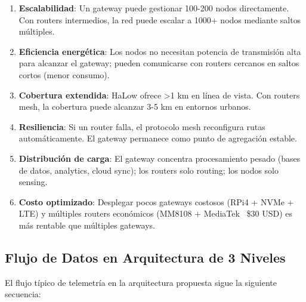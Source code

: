 \begin{enumerate}
    \item \textbf{Escalabilidad}: Un gateway puede gestionar 100-200 nodos directamente. Con routers intermedios, la red puede escalar a 1000+ nodos mediante saltos múltiples.
    \item \textbf{Eficiencia energética}: Los nodos no necesitan potencia de transmisión alta para alcanzar el gateway; pueden comunicarse con routers cercanos en saltos cortos (menor consumo).
    \item \textbf{Cobertura extendida}: HaLow ofrece >1 km en línea de vista. Con routers mesh, la cobertura puede alcanzar 3-5 km en entornos urbanos.
    \item \textbf{Resiliencia}: Si un router falla, el protocolo mesh reconfigura rutas automáticamente. El gateway permanece como punto de agregación estable.
    \item \textbf{Distribución de carga}: El gateway concentra procesamiento pesado (bases de datos, analytics, cloud sync); los routers solo routing; los nodos solo sensing.
    \item \textbf{Costo optimizado}: Desplegar pocos gateways costosos (RPi4 + NVMe + LTE) y múltiples routers económicos (MM8108 + MediaTek ~\$30 USD) es más rentable que múltiples gateways.
\end{enumerate}

\subsection{Flujo de Datos en Arquitectura de 3 Niveles}

El flujo típico de telemetría en la arquitectura propuesta sigue la siguiente secuencia:

